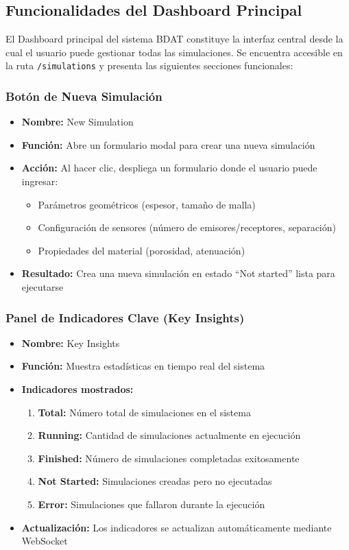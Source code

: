 \subsection{Funcionalidades del Dashboard Principal}
\label{ssc:dashboard}

El Dashboard principal del sistema BDAT constituye la interfaz central desde la cual el usuario puede gestionar todas las simulaciones. Se encuentra accesible en la ruta \texttt{/simulations} y presenta las siguientes secciones funcionales:

\subsubsection{Botón de Nueva Simulación}
\begin{itemize}
    \item \textbf{Nombre:} New Simulation
    \item \textbf{Función:} Abre un formulario modal para crear una nueva simulación
    \item \textbf{Acción:} Al hacer clic, despliega un formulario donde el usuario puede ingresar:
    \begin{itemize}
        \item Parámetros geométricos (espesor, tamaño de malla)
        \item Configuración de sensores (número de emisores/receptores, separación)
        \item Propiedades del material (porosidad, atenuación)
    \end{itemize}
    \item \textbf{Resultado:} Crea una nueva simulación en estado ``Not started'' lista para ejecutarse
\end{itemize}

\subsubsection{Panel de Indicadores Clave (Key Insights)}
\begin{itemize}
    \item \textbf{Nombre:} Key Insights
    \item \textbf{Función:} Muestra estadísticas en tiempo real del sistema
    \item \textbf{Indicadores mostrados:}
    \begin{enumerate}
        \item \textbf{Total:} Número total de simulaciones en el sistema
        \item \textbf{Running:} Cantidad de simulaciones actualmente en ejecución
        \item \textbf{Finished:} Número de simulaciones completadas exitosamente
        \item \textbf{Not Started:} Simulaciones creadas pero no ejecutadas
        \item \textbf{Error:} Simulaciones que fallaron durante la ejecución
    \end{enumerate}
    \item \textbf{Actualización:} Los indicadores se actualizan automáticamente mediante WebSocket
\end{itemize}

